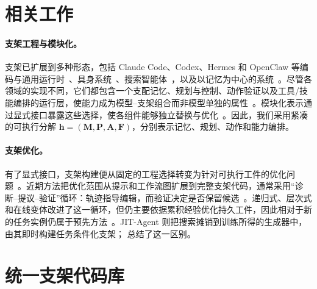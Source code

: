 \documentclass{article}
\newcommand{\ourmethod}{JIT-Agent\xspace}
\begin{document}
\vspace{-0.5em}
\section{相关工作}
\vspace{-0.5em}
\paragraph{支架工程与模块化。} 支架已扩展到多种形态，包括 Claude Code、Codex、Hermes 和 OpenClaw 等编码与通用运行时~\citep{githubGitHubAnthropicsclaudecode,openaiCodexCoding,nous2026hermes,openclaw2026}、具身系统~\citep{zhang2026harnessvla,lee2026physicalaiharness}、搜索智能体~\citep{apodex2026,qin2025flashsearcherfasteffectiveweb}，以及以记忆为中心的系统~\citep{chhikara2025mem0,hu2026evermemos,zhang2025memevolve}。尽管各领域的实现不同，它们都包含一个支配记忆、规划与控制、动作验证以及工具/技能编排的运行层，使能力成为模型--支架组合而非模型单独的属性~\citep{meng2026agent,zhou2026externalizationllmagentsunified,pan2026natural}。模块化表示通过显式接口暴露这些选择，使各组件能够独立替换与优化~\citep{chen2026harnessx,ning2026code}。因此，我们采用紧凑的可执行分解 $\mathbf{h}=(\mathbf{M},\mathbf{P},\mathbf{A},\mathbf{F})$，分别表示记忆、规划、动作和能力编排。
\vspace{-0.5em}
\paragraph{支架优化。} 有了显式接口，支架构建便从固定的工程选择转变为针对可执行工件的优化问题~\citep{khattab2023dspy,yuksekgonul2024textgradautomaticdifferentiationtext,hu2024adas,shang2024agentsquare}。近期方法把优化范围从提示和工作流图扩展到完整支架代码，通常采用“诊断--提议--验证”循环：轨迹指导编辑，而验证决定是否保留候选~\citep{zhang_aflow_2024,lee2026metaharnessendtoendoptimizationmodel,lin2026agenticharnessengineeringobservabilitydriven,chen2026harnessx}。递归式、层次式和在线变体改进了这一循环，但仍主要依据累积经验优化持久工件，因此相对于新的任务实例仍属于预先方法~\citep{lee2026recursiveharness,zhou2026hierarchicalselfimprovement,nie2026tthe,shao2026harnessr1}。\ourmethod 则把搜索摊销到训练所得的生成器中，由其即时构建任务条件化支架； 总结了这一区别。
\vspace{-0.5em}
\section{统一支架代码库}
\vspace{-0.5em}
\label{sec:harness_codebase}
\end{document}
